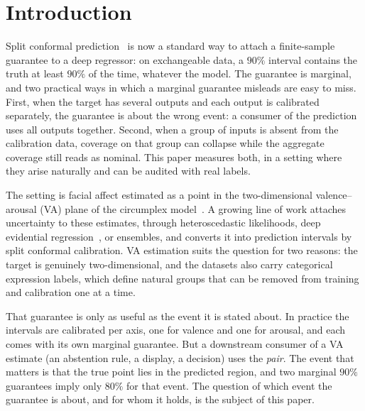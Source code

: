 \section{Introduction}

Split conformal prediction~\cite{vovk2005algorithmic,lei2018distribution} is
now a standard way to attach a finite-sample guarantee to a deep regressor: on
exchangeable data, a $90\%$ interval contains the truth at least $90\%$ of the
time, whatever the model. The guarantee is marginal, and two practical ways in
which a marginal guarantee misleads are easy to miss. First, when the target has
several outputs and each output is calibrated separately, the guarantee is about
the wrong event: a consumer of the prediction uses all outputs together. Second,
when a group of inputs is absent from the calibration data, coverage on that
group can collapse while the aggregate coverage still reads as nominal. This
paper measures both, in a setting where they arise naturally and can be audited
with real labels.

The setting is facial affect estimated as a point in the two-dimensional
valence--arousal (VA) plane of the circumplex model~\cite{russell1980circumplex}.
A growing line of work attaches uncertainty to these estimates, through
heteroscedastic likelihoods, deep evidential
regression~\cite{amini2020evidential,wu2023deer}, or ensembles, and converts it
into prediction intervals by split conformal calibration. VA estimation suits the
question for two reasons: the target is genuinely two-dimensional, and the
datasets also carry categorical expression labels, which define natural groups
that can be removed from training and calibration one at a time.

That guarantee is only as useful as the event it is stated about. In practice
the intervals are calibrated per axis, one for valence and one for arousal, and
each comes with its own marginal guarantee. But a downstream consumer of a VA
estimate (an abstention rule, a display, a decision) uses the \emph{pair}. The
event that matters is that the true point lies in the predicted region, and two
marginal $90\%$ guarantees imply only $80\%$ for that event. The question of
which event the guarantee is about, and for whom it holds, is the subject of
this paper.

